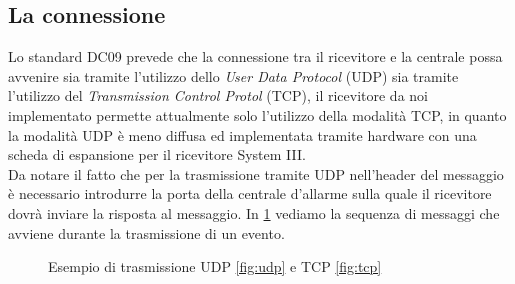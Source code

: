 \subsection{La connessione}
Lo standard DC09 prevede che la connessione tra il ricevitore e la centrale possa avvenire sia tramite l'utilizzo dello \emph{User Data Protocol} (UDP) sia tramite l'utilizzo del \emph{Transmission Control Protol} (TCP), il ricevitore da noi implementato permette attualmente solo l'utilizzo della modalità TCP, in quanto la modalità UDP è meno diffusa ed implementata tramite hardware con una scheda di espansione per il ricevitore System III.\\
Da notare il fatto che per la trasmissione tramite UDP nell'header del messaggio è necessario introdurre la porta della centrale d'allarme sulla quale il ricevitore dovrà inviare la risposta al messaggio.
In \figurename \ref{fig:transmission} vediamo la sequenza di messaggi che avviene durante la trasmissione di un evento.
\begin{figure}
	\centering
	\hspace{5mm}
	\caption{Esempio di trasmissione UDP \ref{fig:udp} e TCP \ref{fig:tcp} }\label{fig:transmission}
\end{figure}
